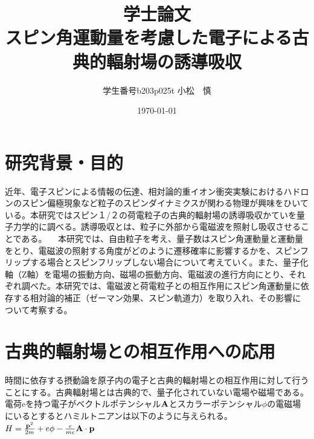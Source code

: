 \documentclass[platex,dvipdfmx]{jlreq}			%
\title{学士論文\\
スピン角運動量を考慮した電子による古典的輻射場の誘導吸収}
\author{学生番号b203p025t 小松　慎}
\date{\today}
\begin{document}
\maketitle
\clearpage
\tableofcontents
\newpage
\section{研究背景・目的}
近年、電子スピンによる情報の伝達、相対論的重イオン衝突実験におけるハドロンのスピン偏極現象など粒子のスピンダイナミクスが関わる物理が興味をひいている。本研究ではスピン１/２の荷電粒子の古典的輻射場の誘導吸収かていを量子力学的に調べる。誘導吸収とは、粒子に外部から電磁波を照射し吸収させることである。
　本研究では、自由粒子を考え、量子数はスピン角運動量と運動量をとり、電磁波の照射する角度がどのように遷移確率に影響するかを、スピンフリップする場合とスピンフリップしない場合について考えていく。また、量子化軸（Z軸）を電場の振動方向、磁場の振動方向、電磁波の進行方向にとり、それぞれ調べた。本研究では、電磁波と荷電粒子との相互作用にスピン角運動量に依存する相対論的補正（ゼーマン効果、スピン軌道力）を取り入れ、その影響について考察する。
\section{古典的輻射場との相互作用への応用}
時間に依存する摂動論を原子内の電子と古典的輻射場との相互作用に対して行うことにする。古典輻射場とは古典的で、量子化されていない電場や磁場である。電荷eを持つ電子がベクトルポテンシャル$\vb{A}$とスカラーポテンシャル$\phi$の電磁場にいるとするとハミルトニアンは以下のように与えられる。
$H=\frac{\vb{p}^2}{2m}+e\phi-\frac{e}{mc}\vb{A}\cdot\vb{p}$
\end{document}
